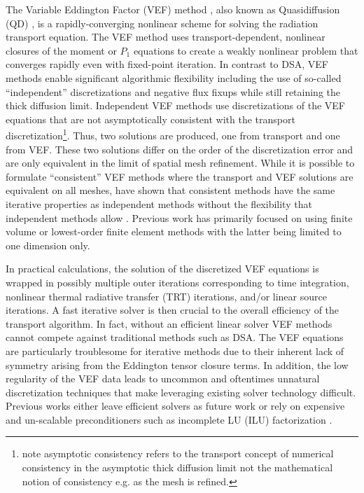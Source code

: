\documentclass[../doc.tex]{subfiles}
\begin{document}
The Variable Eddington Factor (VEF) method \cite{mihalas}, also known as Quasidiffusion (QD) \cite{goldin}, is a rapidly-converging nonlinear scheme for solving the radiation transport equation. The VEF method uses transport-dependent, nonlinear closures of the moment or $P_1$ equations to create a weakly nonlinear problem that converges rapidly even with fixed-point iteration. In contrast to DSA, VEF methods enable significant algorithmic flexibility including the use of so-called ``independent'' discretizations \cite{two-level-independent-warsa,me,olivier_mandc} and negative flux fixups \cite{YEE2020109696} while still retaining the thick diffusion limit. Independent VEF methods use discretizations of the VEF equations that are not asymptotically consistent with the transport discretization\footnote{note asymptotic consistency refers to the transport concept of numerical consistency in the asymptotic thick diffusion limit not the mathematical notion of consistency e.g. as the mesh is refined.}. Thus, two solutions are produced, one from transport and one from VEF. These two solutions differ on the order of the discretization error and are only equivalent in the limit of spatial mesh refinement. While it is possible to formulate ``consistent'' VEF methods where the transport and VEF solutions are equivalent on all meshes, \citeauthor{two-level-independent-warsa} have shown that consistent methods have the same iterative properties as independent methods without the flexibility that independent methods allow \cite{two-level-independent-warsa}. Previous work has primarily focused on using finite volume \cite{weasel,wieselquist,Jones2019TheQM} or lowest-order finite element methods \cite{two-level-independent-warsa,ho_trt_maginot,LOU2019258} with the latter being limited to one dimension only. 

In practical calculations, the solution of the discretized VEF equations is wrapped in possibly multiple outer iterations corresponding to time integration, nonlinear thermal radiative transfer (TRT) iterations, and/or linear source iterations. A fast iterative solver is then crucial to the overall efficiency of the transport algorithm. In fact, without an efficient linear solver VEF methods cannot compete against traditional methods such as DSA. The VEF equations are particularly troublesome for iterative methods due to their inherent lack of symmetry arising from the Eddington tensor closure terms. In addition, the low regularity of the VEF data leads to uncommon and oftentimes unnatural discretization techniques that make leveraging existing solver technology difficult. Previous works either leave efficient solvers as future work \cite{two-level-independent-warsa,me,LOU2019258} or rely on expensive and un-scalable preconditioners such as incomplete LU (ILU) factorization \cite{weasel}. 
\end{document}
